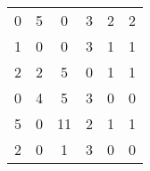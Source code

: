 \begin{tabular}{cccccc}
\rowcolor[rgb]{ .929,  .49,  .192} 0      & \cellcolor[rgb]{ 1,  1,  1} 5 & \cellcolor[rgb]{ 1,  1,  1} 0 & \cellcolor[rgb]{ 1,  1,  1} 3 & \cellcolor[rgb]{ 1,  1,  1} 2 & \cellcolor[rgb]{ 1,  1,  1} 2 \\
1      & 0      & \cellcolor[rgb]{ .929,  .49,  .192} 0 & 3      & 1      & 1 \\
2      & 2      & 5      & \cellcolor[rgb]{ .929,  .49,  .192} 0 & 1      & 1 \\
0      & 4      & 5      & 3      & 0      & \cellcolor[rgb]{ .929,  .49,  .192} 0 \\
5      & \cellcolor[rgb]{ .929,  .49,  .192} 0 & 11     & 2      & 1      & 1 \\
2      & 0      & 1      & 3      & \cellcolor[rgb]{ .929,  .49,  .192} 0 & 0 \bigstrut[b]\\
\hline
\hline
\end{tabular}%
